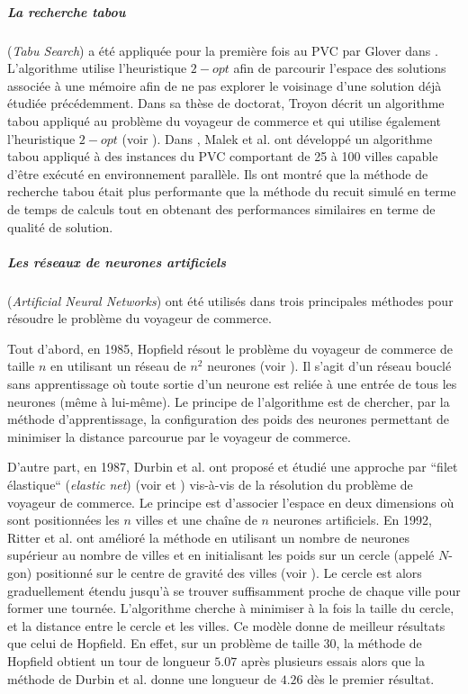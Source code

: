 \subparagraph{La recherche tabou} (\textit{Tabu Search}) a été appliquée pour la première fois au PVC par Glover dans \cite{Glover1986}. L'algorithme utilise l'heuristique $2-opt$ afin de parcourir l'espace des solutions associée à une mémoire afin de ne pas explorer le voisinage d'une solution déjà étudiée précédemment. Dans sa thèse de doctorat, Troyon décrit un algorithme tabou appliqué au problème du voyageur de commerce et qui utilise également l'heuristique $2-opt$ (voir \cite{Troyon1988}). Dans \cite{Malek1989}, Malek et al. ont développé un algorithme tabou appliqué à des instances du PVC comportant de 25 à 100 villes capable d'être exécuté en environnement parallèle. Ils ont montré que la méthode de recherche tabou était plus performante que la méthode du recuit simulé en terme de temps de calculs tout en obtenant des performances similaires en terme de qualité de solution.

\subparagraph{Les réseaux de neurones artificiels} (\textit{Artificial Neural Networks}) ont été utilisés dans trois principales méthodes pour résoudre le problème du voyageur de commerce.

Tout d'abord, en 1985, Hopfield résout le problème du voyageur de commerce de taille $n$ en utilisant un réseau de $n^2$ neurones (voir \cite{Hopfield1985}). Il s'agit d'un réseau bouclé sans apprentissage où toute sortie d'un neurone est reliée à une entrée de tous les neurones (même à lui-même). Le principe de l'algorithme est de chercher, par la méthode d'apprentissage, la configuration des poids des neurones permettant de minimiser la distance parcourue par le voyageur de commerce.

D'autre part, en 1987, Durbin et al. ont proposé et étudié une approche par ``filet élastique`` (\textit{elastic net}) (voir \cite{Durbin1987} et \cite{Durbin1989}) vis-à-vis de la résolution du problème de voyageur de commerce. Le principe est d'associer l'espace en deux dimensions où sont positionnées les $n$ villes et une chaîne de $n$ neurones artificiels. En 1992, Ritter et al. ont amélioré la méthode en utilisant un nombre de neurones supérieur au nombre de villes et en initialisant les poids sur un cercle (appelé $N$-gon) positionné sur le centre de gravité des villes (voir \cite{Ritter1992}). Le cercle est alors graduellement étendu jusqu'à se trouver suffisamment proche de chaque ville pour former une tournée. L'algorithme cherche à minimiser à la fois la taille du cercle, et la distance entre le cercle et les villes. Ce modèle donne de meilleur résultats que celui de Hopfield. En effet, sur un problème de taille 30, la méthode de Hopfield obtient un tour de longueur $5.07$ après plusieurs essais 
alors que la méthode de Durbin et al. donne une longueur de $4.26$ dès le premier résultat.

